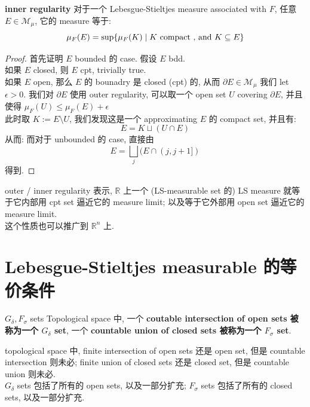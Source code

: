 \documentclass[lang=cn,11pt]{elegantbook}
\begin{document}
\begin{theorem}{\textbf{inner regularity}}
\label{inner regularity}
对于一个 Lebesgue-Stieltjes measure associated with $F$, 任意 $E \in \mathcal{M}_\mu$, 它的 measure 等于:
\begin{equation}
    \mu_F(E) = \sup \{ \mu_F(K) \mid  K \text{ compact , and } K \subseteq E  \}
\end{equation}
\end{theorem}
\begin{proof}
    首先证明 $E$ bounded 的 case. 假设 $E$ bdd. \\
    如果 $E$ closed, 则 $E$ cpt, trivially true. \\
    如果 $E$ open, 那么 $E$ 的 bounadry 是 closed (cpt) 的, 从而 $\partial E \in \mathcal{M}_\mu$ 
    我们 let $\epsilon >0$. 我们对 $\partial E$ 使用 outer regularity, 可以取一个 open set $U$ covering $\partial E$, 并且使得 $\mu_F(U) \leq \mu_F(E) + \epsilon$\\
    此时取 $K := E \setminus U$, 我们发现这是一个 approximating $E$ 的 compact set, 并且有:
    $$
    E = K \sqcup (U \cap E)
    $$
从而:
而对于 unbounded 的 case, 直接由 
$$
E  = \bigsqcup_j (E \cap (j,j+1])
$$得到.
\end{proof}
\begin{remark}
outer / inner regularity 表示, $\mathbb{R}$ 上一个 (LS-measurable set 的) LS measure 就等于它内部用 cpt set 逼近它的 measure limit; 以及等于它外部用 open set 逼近它的 measure limit.\\
这个性质也可以推广到 $\mathbb{R}^n$ 上.
\end{remark}




\section{Lebesgue-Stieltjes measurable 的等价条件}
\begin{definition}{$G_\delta, F_\sigma$ sets}
Topological space 中, 一个 \textbf{coutable intersection of open sets 被称为一个 $G_\delta$ set}, 一个 \textbf{countable union of closed sets 被称为一个 $F_\sigma$ set}.
\end{definition}
\begin{remark}
    topological space 中, finite intersection of open sets 还是 open set, 但是 countable intersection 则未必; finite union of closed sets 还是 closed set, 但是 countable union 则未必.\\
$G_\delta$ sets 包括了所有的 open sets, 以及一部分扩充; $F_\sigma$ sets 包括了所有的 closed sets, 以及一部分扩充.
\end{remark}
\end{document}
